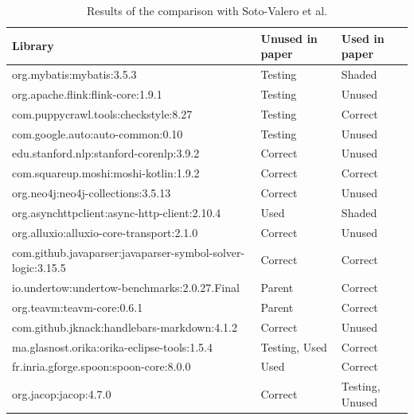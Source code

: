 \begin{table}[ht!]
\begin{center}
\begin{tabular}{|l|l|l|}
\hline
\textbf{Library} & \textbf{Unused in paper} & \textbf{Used in paper} \\ \hline
org.mybatis:mybatis:3.5.3                                   & Testing       & Shaded        \\ \hline
org.apache.flink:flink-core:1.9.1                           & Testing       & Unused          \\ \hline
com.puppycrawl.tools:checkstyle:8.27                        & Testing       & Correct         \\ \hline
com.google.auto:auto-common:0.10                            & Testing       & Unused          \\ \hline
edu.stanford.nlp:stanford-corenlp:3.9.2                     & Correct       & Unused          \\ \hline
com.squareup.moshi:moshi-kotlin:1.9.2                       & Correct       & Correct         \\ \hline
org.neo4j:neo4j-collections:3.5.13                          & Correct       & Unused          \\ \hline
org.asynchttpclient:async-http-client:2.10.4                & Used          & Shaded        \\ \hline
org.alluxio:alluxio-core-transport:2.1.0                    & Correct       & Unused          \\ \hline
com.github.javaparser:javaparser-symbol-solver-logic:3.15.5 & Correct       & Correct         \\ \hline
io.undertow:undertow-benchmarks:2.0.27.Final                & Parent        & Correct         \\ \hline
org.teavm:teavm-core:0.6.1                                  & Parent        & Correct         \\ \hline
com.github.jknack:handlebars-markdown:4.1.2                 & Correct       & Unused          \\ \hline
ma.glasnost.orika:orika-eclipse-tools:1.5.4                 & Testing, Used & Correct         \\ \hline
fr.inria.gforge.spoon:spoon-core:8.0.0                      & Used          & Correct         \\ \hline
org.jacop:jacop:4.7.0                                       & Correct       & Testing, Unused \\ \hline
\end{tabular}
\end{center}
\caption{Results of the comparison with Soto-Valero et al. \cite{soto2020comprehensive}}
\label{table:comparison-results}
\end{table}

